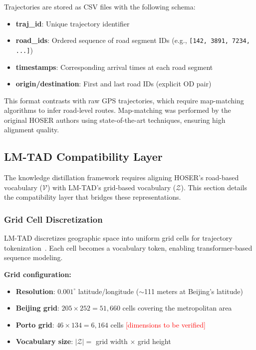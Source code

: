 Trajectories are stored as CSV files with the following schema:

\begin{itemize}[noitemsep,topsep=0pt]
\item \textbf{traj\_id}: Unique trajectory identifier
\item \textbf{road\_ids}: Ordered sequence of road segment IDs (e.g., \texttt{[142, 3891, 7234, ...]})
\item \textbf{timestamps}: Corresponding arrival times at each road segment
\item \textbf{origin/destination}: First and last road IDs (explicit OD pair)
\end{itemize}

This format contrasts with raw GPS trajectories, which require map-matching algorithms to infer road-level routes. Map-matching was performed by the original HOSER authors using state-of-the-art techniques, ensuring high alignment quality.

\subsection{LM-TAD Compatibility Layer}
\label{sec:data-lmtad-compat}

The knowledge distillation framework requires aligning HOSER's road-based vocabulary ($\mathcal{V}$) with LM-TAD's grid-based vocabulary ($\mathcal{Z}$). This section details the compatibility layer that bridges these representations.

\subsubsection{Grid Cell Discretization}

LM-TAD discretizes geographic space into uniform grid cells for trajectory tokenization~\cite{heSpatiotemporalTrajectoryAnomaly2022}. Each cell becomes a vocabulary token, enabling transformer-based sequence modeling.

\textbf{Grid configuration:}
\begin{itemize}[noitemsep,topsep=0pt]
\item \textbf{Resolution}: $0.001^\circ$ latitude/longitude ($\sim$111 meters at Beijing's latitude)
\item \textbf{Beijing grid}: $205 \times 252 = 51{,}660$ cells covering the metropolitan area
\item \textbf{Porto grid}: $46 \times 134 = 6{,}164$ cells \textcolor{red}{[dimensions to be verified]}
\item \textbf{Vocabulary size}: $|\mathcal{Z}| = $ grid width $\times$ grid height
\end{itemize}

